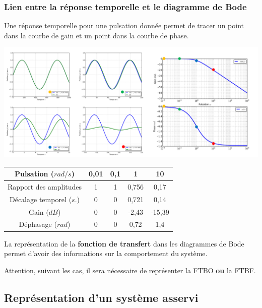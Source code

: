 \documentclass[10pt,oneside]{article}
\begin{document}
\subsubsection{Lien entre la réponse temporelle et le diagramme de Bode}
Une réponse temporelle pour une pulsation donnée permet de tracer un point dans la courbe de gain et un point dans la courbe de phase.
\begin{center}
\includegraphics[width=\textwidth]{png/temp_bode}
\end{center}

\begin{center}
\begin{tabular}{|c|c|c|c|c|}
\hline
Pulsation ($rad/s$) & 0,01 & 0,1 & 1 & 10\\
\hline
Rapport des amplitudes & 1 & 1 & 0,756 & 0,17 \\
\hline
Décalage temporel ($s.$) & 0 & 0 &0,721  &0,14  \\
\hline
Gain ($dB$) & 0 & 0 & -2,43 %
& -15,39 %
\\
\hline
Déphasage ($rad$) & 0 & 0 & 0,72 & 1,4\\
\hline
\end{tabular}
\end{center}
% 


\begin{resultat}
La représentation de la \textbf{fonction de transfert} dans les diagrammes de Bode permet d'avoir des informations sur la comportement du système. 

Attention, suivant les cas, il sera nécessaire de représenter la FTBO \textbf{ou} la FTBF.
\end{resultat}
\subsection{Représentation d'un système asservi}
\end{document}
